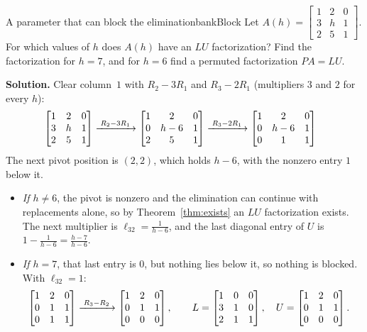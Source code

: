 \documentclass[11pt]{article}
\begin{document}
\begin{exmp}{A parameter that can block the elimination}{bankBlock}
Let $A(h)=\begin{bmatrix}1&2&0\\3&h&1\\2&5&1\end{bmatrix}$. For which values of $h$ does $A(h)$ have an $LU$ factorization? Find the factorization for $h=7$, and for $h=6$ find a permuted factorization $PA=LU$.

\textbf{Solution.} Clear column~$1$ with $R_2-3R_1$ and $R_3-2R_1$ (multipliers $3$ and $2$ for every $h$):
\begin{align*}
&\begin{bmatrix}1&2&0\\3&h&1\\2&5&1\end{bmatrix}
\xrightarrow{\;R_2-3R_1\;}
\begin{bmatrix}1&2&0\\0&h-6&1\\2&5&1\end{bmatrix}
\xrightarrow{\;R_3-2R_1\;}
\begin{bmatrix}1&2&0\\0&h-6&1\\0&1&1\end{bmatrix}
\end{align*}
The next pivot position is $(2,2)$, which holds $h-6$, with the nonzero entry $1$ below it.
\begin{itemize}
  \item \emph{If $h\neq6$}, the pivot is nonzero and the elimination can continue with replacements alone, so by Theorem~\ref{thm:exists} an $LU$ factorization exists. The next multiplier is $\ell_{32}=\frac{1}{h-6}$, and the last diagonal entry of $U$ is $1-\frac1{h-6}=\frac{h-7}{h-6}$.
  \item \emph{If $h=7$}, that last entry is $0$, but nothing lies below it, so nothing is blocked. With $\ell_{32}=1$:
\begin{align*}
&\begin{bmatrix}1&2&0\\0&1&1\\0&1&1\end{bmatrix}
\rops{R_3-R_2}
\begin{bmatrix}1&2&0\\0&1&1\\0&0&0\end{bmatrix},\qquad
L=\begin{bmatrix}1&0&0\\3&1&0\\2&1&1\end{bmatrix},\quad U=\begin{bmatrix}1&2&0\\0&1&1\\0&0&0\end{bmatrix}.

\end{align*}
\end{itemize}
\end{exmp}
\end{document}
